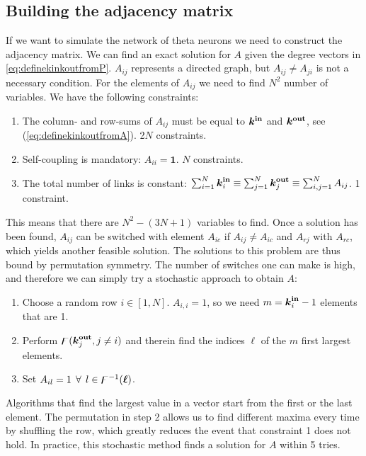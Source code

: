 \subsection{Building the adjacency matrix} \label{sec:buildingA}
If we want to simulate the network of theta neurons we need to construct the adjacency matrix. We can find an exact solution for $A$ given the degree vectors in \eqref{eq:definekinkoutfromP}. $A_{ij}$ represents a directed graph, but $A_{ij} \neq A_{ji}$ is not a necessary condition. For the elements of $A_{ij}$ we need to find $N^2$ number of variables. We have the following constraints:
\begin{enumerate}
\item The column- and row-sums of $A_{ij}$ must be equal to ${\boldsymbol{k^{\rm in}}}$ and $\boldsymbol{{k^{\rm out}}}$, see (\ref{eq:definekinkoutfromA}). 2$N$ constraints.
\item Self-coupling is mandatory: $A_{ii} = \boldsymbol{1}$. $N$ constraints. \cite{OttAntonsen2017}
\item The total number of links is constant: $\sum_{i=1}^{N} {\boldsymbol{k}_i^{\bf in}} \equiv \sum_{j=1}^{N} {\boldsymbol{k}_j^{\bf out}} \equiv \sum_{i,j=1}^{N}A_{i j}$. 1 constraint.
\end{enumerate}
This means that there are $N^2 - (3N + 1)$ variables to find. Once a solution has been found, $A_{ij}$ can be switched with element $A_{ic}$ if $A_{ij} \neq A_{ic}$ and $A_{rj}$ with $A_{rc}$, which yields another feasible solution. The solutions to this problem are thus bound by permutation symmetry. The number of switches one can make is high, and therefore we can simply try a stochastic approach to obtain $A$:
\begin{enumerate}
\item Choose a random row $i \in [1,N]$. $A_{i,i} = 1$, so we need $m = {\boldsymbol{k}_i^{\bf in}} - 1$ elements that are 1.
\item Perform ${\digamma} ( {\boldsymbol{k}_j^{\bf out}}, j \neq i)$ and therein find the indices $\boldsymbol{\ell}$ of the $m$ first largest elements. 
\item Set $A_{il} = 1 \: \: \forall \: \: l \in {\digamma^{-1}} (\boldsymbol{\ell})$.
\end{enumerate}
Algorithms that find the largest value in a vector start from the first or the last element. The permutation in step 2 allows us to find different maxima every time by shuffling the row, which greatly reduces the event that constraint 1 does not hold. In practice, this stochastic method finds a solution for $A$ within 5 tries.

